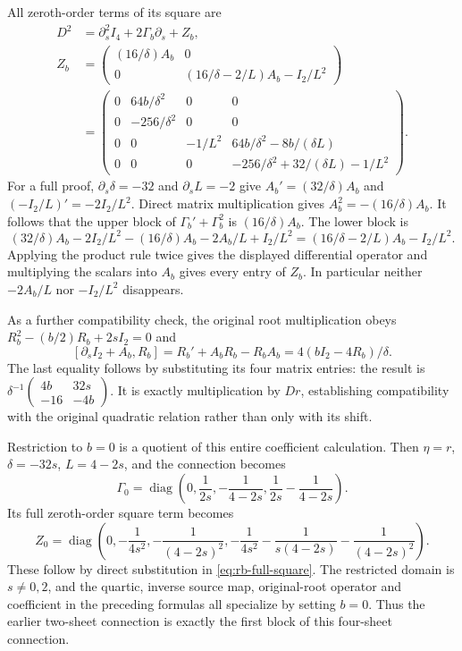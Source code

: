 All zeroth-order terms of its square are
\begin{equation}\label{eq:rb-full-square}
 \begin{aligned}
 D^2&=\partial_s^2I_4+2\Gamma_b\partial_s+Z_b,\\
 Z_b&=\begin{pmatrix}
 (16/\delta)A_b&0\\
 0&(16/\delta-2/L)A_b-I_2/L^2
 \end{pmatrix}\\
 &=\begin{pmatrix}
 0&64b/\delta^2&0&0\\
 0&-256/\delta^2&0&0\\
 0&0&-1/L^2&64b/\delta^2-8b/(\delta L)\\
 0&0&0&-256/\delta^2+32/(\delta L)-1/L^2
 \end{pmatrix}.
 \end{aligned}
\end{equation}
For a full proof, $\partial_s\delta=-32$ and $\partial_sL=-2$ give
$A_b'=(32/\delta)A_b$ and $(-I_2/L)'=-2I_2/L^2$.
Direct matrix multiplication gives $A_b^2=-(16/\delta)A_b$.
It follows that the upper block of $\Gamma_b'+\Gamma_b^2$ is
$(16/\delta)A_b$. The lower block is
\[
 (32/\delta)A_b-2I_2/L^2
 -(16/\delta)A_b-2A_b/L+I_2/L^2
 =(16/\delta-2/L)A_b-I_2/L^2.
\]
Applying the product rule twice gives the displayed differential
operator and multiplying the scalars into $A_b$ gives every entry
of $Z_b$. In particular neither $-2A_b/L$ nor $-I_2/L^2$ disappears.

As a further compatibility check, the original root multiplication
obeys $R_b^2-(b/2)R_b+2sI_2=0$ and
\[
 [\partial_sI_2+A_b,R_b]
 =R_b'+A_bR_b-R_bA_b=4(bI_2-4R_b)/\delta.
\]
The last equality follows by substituting its four matrix entries:
the result is
$\delta^{-1}\left(\begin{smallmatrix}4b&32s\\-16&-4b\end{smallmatrix}\right)$.
It is exactly multiplication by $Dr$, establishing compatibility
with the original quadratic relation rather than only with its shift.

Restriction to $b=0$ is a quotient of this entire coefficient
calculation. Then $\eta=r$, $\delta=-32s$, $L=4-2s$, and the
connection becomes
\[
 \Gamma_0=\operatorname{diag}
 \left(0,\frac1{2s},-\frac1{4-2s},
                  \frac1{2s}-\frac1{4-2s}\right).
\]
Its full zeroth-order square term becomes
\[
 Z_0=\operatorname{diag}
 \left(0,-\frac1{4s^2},-\frac1{(4-2s)^2},
 -\frac1{4s^2}-\frac1{s(4-2s)}-\frac1{(4-2s)^2}\right).
\]
These follow by direct substitution in \eqref{eq:rb-full-square}.
The restricted domain is $s\ne0,2$, and the quartic, inverse source
map, original-root operator and coefficient in the preceding formulas
all specialize by setting $b=0$. Thus the earlier two-sheet connection
is exactly the first block of this four-sheet connection.

